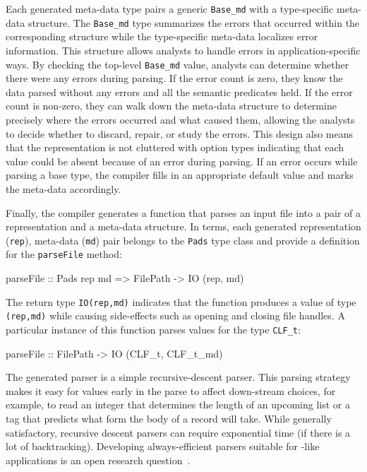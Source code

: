 \documentclass{sig-alternate}
\begin{document}
Each generated meta-data type pairs a generic \texttt{Base\_md} with a
type-specific meta-data structure.  The \texttt{Base\_md} type
summarizes the errors that occurred within the corresponding
structure while the type-specific meta-data localizes error
information.  This structure allows analysts to handle errors in
application-specific ways.  By checking the top-level
\texttt{Base\_md} value, analysts can determine whether there were
any errors during parsing. If the error count is zero, they know 
the data parsed without any errors and all the semantic predicates
held.  If the error count is non-zero, they can walk down the
meta-data structure to determine precisely where the errors occurred
and what caused them, allowing the analysts to decide whether to discard,
repair, or study the errors. This design also means that the
representation is not cluttered with option types indicating that each
value could be absent because of an error during parsing.  If an error
occurs while parsing a base type, the compiler fills in an appropriate
default value and marks the meta-data accordingly.


Finally, the compiler generates a function that parses
an input file into a pair of a representation and a meta-data
structure.  In \haskell{} terms, each generated representation (\texttt{rep}),
meta-data (\texttt{md}) pair belongs to the \texttt{Pads} type class and provide
a definition for the \texttt{parseFile} method:
\begin{code}
parseFile :: Pads rep md => 
             FilePath -> IO (rep, md)
\end{code}
The return type \texttt{IO(rep,md)} indicates that the function
produces a value of type \texttt{(rep,md)} while causing side-effects
such as opening and closing file handles.  A particular instance of
this function parses values for the type \texttt{CLF\_t}:
\begin{code}
parseFile :: FilePath -> IO (CLF_t, CLF_t_md)
\end{code}
The generated parser is a simple recursive-descent parser.  This
parsing strategy makes it easy for values early in the parse to affect
down-stream choices, for example, to read an integer that determines
the length of an upcoming list or a tag that predicts what form the
body of a record will take.  While generally satisfactory, recursive
descent parsers can require exponential time (if there is a lot of
backtracking).  Developing always-efficient parsers suitable for
\pads{}-like applications is an open research question~\cite{Jim+:yakker}.
\end{document}
